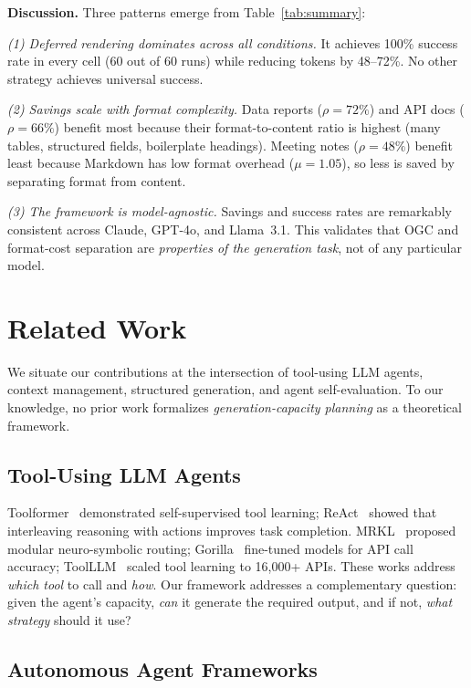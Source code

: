 \documentclass[11pt,twocolumn]{article}
\begin{document}
\textbf{Discussion.}  Three patterns emerge from Table~\ref{tab:summary}:

\emph{(1) Deferred rendering dominates across all conditions.}
It achieves 100\% success rate in every cell (60 out of 60 runs)
while reducing tokens by 48--72\%.  No other strategy achieves
universal success.

\emph{(2) Savings scale with format complexity.}
Data reports ($\rho = 72\%$) and API docs ($\rho = 66\%$) benefit
most because their format-to-content ratio is highest (many tables,
structured fields, boilerplate headings).  Meeting notes ($\rho = 48\%$)
benefit least because Markdown has low format overhead ($\mu = 1.05$),
so less is saved by separating format from content.

\emph{(3) The framework is model-agnostic.}
Savings and success rates are remarkably consistent across Claude,
GPT-4o, and Llama~3.1.  This validates that OGC and format-cost
separation are \emph{properties of the generation task}, not of
any particular model.

\section{Related Work}
\label{sec:related}

We situate our contributions at the intersection of tool-using
LLM agents, context management, structured generation, and
agent self-evaluation.  To our knowledge, no prior work formalizes
\emph{generation-capacity planning} as a theoretical framework.

\subsection{Tool-Using LLM Agents}

Toolformer~\cite{schick2023toolformer} demonstrated self-supervised
tool learning; ReAct~\cite{yao2023react} showed that interleaving
reasoning with actions improves task completion.
MRKL~\cite{karpas2022mrkl} proposed modular neuro-symbolic routing;
Gorilla~\cite{patil2023gorilla} fine-tuned models for API call
accuracy; ToolLLM~\cite{qin2023toolllm} scaled tool learning to
16{,}000+ APIs.  These works address \emph{which tool} to call
and \emph{how}.  Our framework addresses a complementary question:
given the agent's capacity, \emph{can} it generate the required
output, and if not, \emph{what strategy} should it use?

\subsection{Autonomous Agent Frameworks}
\end{document}
